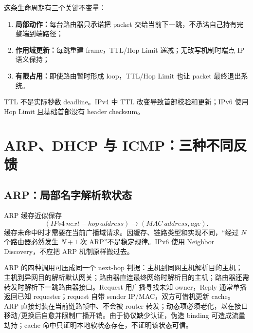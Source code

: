 \documentclass[11pt,a4paper]{ctexart}
\newcommand{\kw}[1]{\textbf{\color{deep}#1}}
\begin{document}
\begin{center}
\end{center}

这条生命周期有三个关键不变量：
\begin{enumerate}
  \item \kw{局部动作：}每台路由器只承诺把 packet 交给当前下一跳，不承诺自己持有完整端到端路径；
  \item \kw{作用域更新：}每跳重建 frame，TTL/Hop Limit 递减；无改写机制时端点 IP 语义保持；
  \item \kw{有限占用：}即使路由暂时形成 loop，TTL/Hop Limit 也让 packet 最终退出系统。
\end{enumerate}

TTL 不是实际秒数 deadline。IPv4 中 TTL 改变导致首部校验和更新；IPv6 使用 Hop Limit 且基础首部没有 header checksum。

\section{ARP、DHCP 与 ICMP：三种不同反馈}

\subsection{ARP：局部名字解析软状态}

ARP 缓存近似保存
\[
(IPv4\ next\!\!-hop\ address)\to(MAC\ address, age).
\]
缓存未命中时才需要在当前广播域请求。因缓存、链路类型和实现不同，“经过 $N$ 个路由器必然发生 $N+1$ 次 ARP”不是稳定规律。IPv6 使用 Neighbor Discovery，不应把 ARP 机制原样搬过去。

ARP 的四种调用可压成同一个 next-hop 判据：主机到同网主机解析目的主机；主机到异网目的解析默认网关；路由器直连最终网络时解析目的主机；路由器还需转发时解析下一跳路由器接口。Request 用广播寻找未知 owner，Reply 通常单播返回已知 requester；request 自带 sender IP/MAC，双方可借机更新 cache。ARP 直接封装在当前链路帧中、不会被 router 转发；动态项必须老化，以在接口移动/更换后自愈并限制广播开销。由于协议缺少认证，伪造 binding 可造成流量劫持；cache 命中只证明本地软状态存在，不证明该状态可信。
\end{document}
